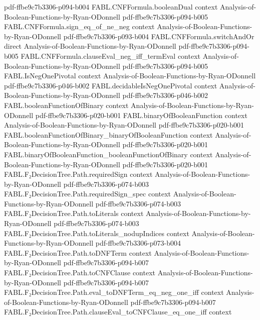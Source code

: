 \begin{theorem}
  {pdf-ffbe9c7b3306-p094-b004}
\proofstep
  {FABL.CNFFormula.booleanDual}
  {context}
  {Analysis-of-Boolean-Functions-by-Ryan-ODonnell}
  {pdf-ffbe9c7b3306-p094-b005}
\proofstep
  {FABL.CNFFormula.sign_eq_of_ne_neg}
  {context}
  {Analysis-of-Boolean-Functions-by-Ryan-ODonnell}
  {pdf-ffbe9c7b3306-p093-b004}
\proofstep
  {FABL.CNFFormula.switchAndOr}
  {direct}
  {Analysis-of-Boolean-Functions-by-Ryan-ODonnell}
  {pdf-ffbe9c7b3306-p094-b005}
\proofstep
  {FABL.CNFFormula.clauseEval_neg_iff_termEval}
  {context}
  {Analysis-of-Boolean-Functions-by-Ryan-ODonnell}
  {pdf-ffbe9c7b3306-p094-b005}
\proofstep
  {FABL.IsNegOnePivotal}
  {context}
  {Analysis-of-Boolean-Functions-by-Ryan-ODonnell}
  {pdf-ffbe9c7b3306-p046-b002}
\proofstep
  {FABL.decidableIsNegOnePivotal}
  {context}
  {Analysis-of-Boolean-Functions-by-Ryan-ODonnell}
  {pdf-ffbe9c7b3306-p046-b002}
\proofstep
  {FABL.booleanFunctionOfBinary}
  {context}
  {Analysis-of-Boolean-Functions-by-Ryan-ODonnell}
  {pdf-ffbe9c7b3306-p020-b001}
\proofstep
  {FABL.binaryOfBooleanFunction}
  {context}
  {Analysis-of-Boolean-Functions-by-Ryan-ODonnell}
  {pdf-ffbe9c7b3306-p020-b001}
\proofstep
  {FABL.booleanFunctionOfBinary_binaryOfBooleanFunction}
  {context}
  {Analysis-of-Boolean-Functions-by-Ryan-ODonnell}
  {pdf-ffbe9c7b3306-p020-b001}
\proofstep
  {FABL.binaryOfBooleanFunction_booleanFunctionOfBinary}
  {context}
  {Analysis-of-Boolean-Functions-by-Ryan-ODonnell}
  {pdf-ffbe9c7b3306-p020-b001}
\proofstep
  {FABL.F₂DecisionTree.Path.requiredSign}
  {context}
  {Analysis-of-Boolean-Functions-by-Ryan-ODonnell}
  {pdf-ffbe9c7b3306-p074-b003}
\proofstep
  {FABL.F₂DecisionTree.Path.requiredSign_spec}
  {context}
  {Analysis-of-Boolean-Functions-by-Ryan-ODonnell}
  {pdf-ffbe9c7b3306-p074-b003}
\proofstep
  {FABL.F₂DecisionTree.Path.toLiterals}
  {context}
  {Analysis-of-Boolean-Functions-by-Ryan-ODonnell}
  {pdf-ffbe9c7b3306-p074-b003}
\proofstep
  {FABL.F₂DecisionTree.Path.toLiterals_nodupIndices}
  {context}
  {Analysis-of-Boolean-Functions-by-Ryan-ODonnell}
  {pdf-ffbe9c7b3306-p073-b004}
\proofstep
  {FABL.F₂DecisionTree.Path.toDNFTerm}
  {context}
  {Analysis-of-Boolean-Functions-by-Ryan-ODonnell}
  {pdf-ffbe9c7b3306-p094-b007}
\proofstep
  {FABL.F₂DecisionTree.Path.toCNFClause}
  {context}
  {Analysis-of-Boolean-Functions-by-Ryan-ODonnell}
  {pdf-ffbe9c7b3306-p094-b007}
\proofstep
  {FABL.F₂DecisionTree.Path.eval_toDNFTerm_eq_neg_one_iff}
  {context}
  {Analysis-of-Boolean-Functions-by-Ryan-ODonnell}
  {pdf-ffbe9c7b3306-p094-b007}
\proofstep
  {FABL.F₂DecisionTree.Path.clauseEval_toCNFClause_eq_one_iff}
  {context}

\end{theorem}
